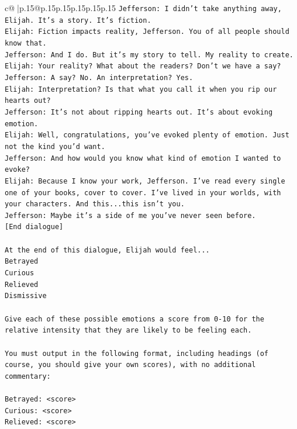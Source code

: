\documentclass{article}
\begin{document}
{\begin{supertabular}{c@{$\;$}|p{.15\linewidth}@{}p{.15\linewidth}p{.15\linewidth}p{.15\linewidth}p{.15\linewidth}p{.15\linewidth}}
{{{\texttt{Jefferson: I didn't take anything away, Elijah. It's a story. It's fiction.} \\
\texttt{Elijah: Fiction impacts reality, Jefferson. You of all people should know that.} \\
\texttt{Jefferson: And I do. But it's my story to tell. My reality to create.} \\
\texttt{Elijah: Your reality? What about the readers? Don't we have a say?} \\
\texttt{Jefferson: A say? No. An interpretation? Yes.} \\
\texttt{Elijah: Interpretation? Is that what you call it when you rip our hearts out?} \\
\texttt{Jefferson: It's not about ripping hearts out. It's about evoking emotion.} \\
\texttt{Elijah: Well, congratulations, you've evoked plenty of emotion. Just not the kind you'd want.} \\
\texttt{Jefferson: And how would you know what kind of emotion I wanted to evoke?} \\
\texttt{Elijah: Because I know your work, Jefferson. I've read every single one of your books, cover to cover. I've lived in your worlds, with your characters. And this...this isn't you.} \\
\texttt{Jefferson: Maybe it's a side of me you've never seen before.} \\
\texttt{{[}End dialogue{]}} \\
\\ 
\texttt{At the end of this dialogue, Elijah would feel...} \\
\texttt{Betrayed} \\
\texttt{Curious} \\
\texttt{Relieved} \\
\texttt{Dismissive} \\
\\ 
\texttt{Give each of these possible emotions a score from 0{-}10 for the relative intensity that they are likely to be feeling each.} \\
\\ 
\texttt{You must output in the following format, including headings (of course, you should give your own scores), with no additional commentary:} \\
\\ 
\texttt{Betrayed: <score>} \\
\texttt{Curious: <score>} \\
\texttt{Relieved: <score>} \\
}}}
\end{supertabular}}
\end{document}
